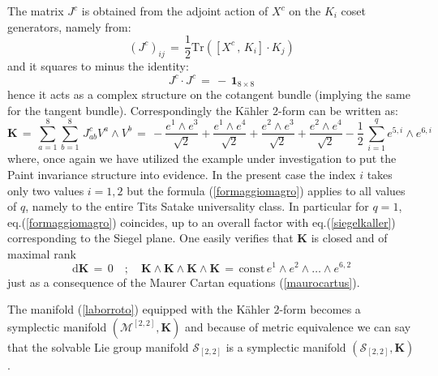 \documentclass[10pt,a4paper]{article}
\newcommand{\ft}[2]{{\textstyle\frac{#1}{#2}}}
\begin{document}
The matrix $J^c$
is obtained from the adjoint action of $X^c$ on the $K_i$ coset generators, namely from:
\begin{equation}\label{aggiungoazio}
  (J^c)_{ij} \, = \, \ft 12 \text{Tr} \left( \left[X^c \, , \, K_i\right] \cdot K_j\right)
\end{equation}
and it squares to minus the identity:
\begin{equation}\label{carolonagalbani}
  J^c\cdot J^c \, = \, - \, \mathbf{1}_{8\times 8}
\end{equation}
hence it acts as a complex structure on the cotangent bundle (implying the same for the tangent bundle). Correspondingly the K\"ahler $2$-form can be written as:
\begin{equation}\label{formaggiomagro}
  \mathbf{K} \, = \, \sum_{a=1}^8 \sum_{b=1}^8 \, J^c_{ab} V^a\wedge V^b \, = \, -\frac{e^{1}\wedge e^{3}}{\sqrt{2}}+\frac{e^{1}\wedge e^{4}}{\sqrt{2}}+\frac{e^{2}\wedge
   e^{3}}{\sqrt{2}}+\frac{e^{2}\wedge e^{4}}{\sqrt{2}}-\frac{1}{2} \,\sum_{i=1}^{q} e^{5,i}\wedge
   e^{6,i}
\end{equation}
where, once again we have utilized the example under investigation to put the Paint invariance structure into evidence. In the present case the index $i$ takes only two values $i=1,2$ but the formula (\ref{formaggiomagro})
applies to all values of $q$, namely to the entire Tits Satake universality class. In particular for $q=1$, eq.(\ref{formaggiomagro}) coincides, up to an overall factor with eq.(\ref{siegelkaller}) corresponding to the Siegel plane. One  easily verifies that $\mathbf{K}$ is closed and of maximal rank
\begin{equation}\label{domenicano}
  \mathrm{d} \mathbf{K}  \, = \, 0 \quad ; \quad \mathbf{K}\wedge\mathbf{K}\wedge \mathbf{K}\wedge\mathbf{K} \, = \, \text{const} \,
  e^1 \wedge e^2 \wedge \dots \wedge e^{6,2}
\end{equation}
 just as a consequence of the Maurer Cartan equations (\ref{maurocartus}).
\par
The manifold (\ref{laborroto}) equipped with the K\"ahler $2$-form becomes a symplectic manifold $(\mathcal{M}^{[2,2]},\mathbf{K})$ and because of metric equivalence we can say that the solvable Lie group manifold $\mathcal{S}_{[2,2]}$ is a symplectic manifold
$(\mathcal{S}_{[2,2]},\mathbf{K})$.
\end{document}
